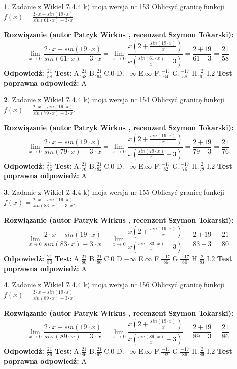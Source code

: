 \documentclass[12pt, a4paper]{article}
\theoremstyle{definition} %
\newtheorem{zad}{}
\newcommand{\zadStart}[1]{\begin{zad}#1\newline}
\newcommand{\zadStop}{\end{zad}}
\newcommand{\rozwStart}[2]{\noindent \textbf{Rozwiązanie (autor #1 , recenzent #2): }\newline}
\newcommand{\rozwStop}{\newline}
\newcommand{\odpStart}{\noindent \textbf{Odpowiedź:}\newline}
\newcommand{\odpStop}{\newline}
\newcommand{\testStart}{\noindent \textbf{Test:}\newline}
\newcommand{\testStop}{\newline}
\newcommand{\kluczStart}{\noindent \textbf{Test poprawna odpowiedź:}\newline}
\newcommand{\kluczStop}{\newline}
\begin{document}
\zadStart{Zadanie z Wikieł Z 4.4 k) moja wersja nr 153}
Obliczyć granicę funkcji $f(x)=\frac{2\cdot x +sin(19\cdot x)}{sin(61\cdot x) -3\cdot x}$.
\zadStop
\rozwStart{Patryk Wirkus}{Szymon Tokarski}
$$\lim\limits_{x\to 0}\frac{2\cdot x +sin(19\cdot x)}{sin(61\cdot x) -3\cdot x}
=\lim\limits_{x\to 0}\frac{x(2+\frac{sin(19\cdot x)}{x})}{x(\frac{sin(61\cdot x)}{x}-3)}
=\frac{2+19}{61-3} = \frac{21}{58}$$
\rozwStop
\odpStart
$\frac{21}{58}$
\odpStop
\testStart
A.$\frac{21}{58}$
B.$\frac{21}{64}$
C.$0$
D.$-\infty$
E.$\infty$
F.$\frac{-17}{64}$
G.$\frac{-17}{58}$
H.$\frac{2}{61}$
I.$2$
\testStop
\kluczStart
A
\kluczStop



\zadStart{Zadanie z Wikieł Z 4.4 k) moja wersja nr 154}
Obliczyć granicę funkcji $f(x)=\frac{2\cdot x +sin(19\cdot x)}{sin(79\cdot x) -3\cdot x}$.
\zadStop
\rozwStart{Patryk Wirkus}{Szymon Tokarski}
$$\lim\limits_{x\to 0}\frac{2\cdot x +sin(19\cdot x)}{sin(79\cdot x) -3\cdot x}
=\lim\limits_{x\to 0}\frac{x(2+\frac{sin(19\cdot x)}{x})}{x(\frac{sin(79\cdot x)}{x}-3)}
=\frac{2+19}{79-3} = \frac{21}{76}$$
\rozwStop
\odpStart
$\frac{21}{76}$
\odpStop
\testStart
A.$\frac{21}{76}$
B.$\frac{21}{82}$
C.$0$
D.$-\infty$
E.$\infty$
F.$\frac{-17}{82}$
G.$\frac{-17}{76}$
H.$\frac{2}{79}$
I.$2$
\testStop
\kluczStart
A
\kluczStop



\zadStart{Zadanie z Wikieł Z 4.4 k) moja wersja nr 155}
Obliczyć granicę funkcji $f(x)=\frac{2\cdot x +sin(19\cdot x)}{sin(83\cdot x) -3\cdot x}$.
\zadStop
\rozwStart{Patryk Wirkus}{Szymon Tokarski}
$$\lim\limits_{x\to 0}\frac{2\cdot x +sin(19\cdot x)}{sin(83\cdot x) -3\cdot x}
=\lim\limits_{x\to 0}\frac{x(2+\frac{sin(19\cdot x)}{x})}{x(\frac{sin(83\cdot x)}{x}-3)}
=\frac{2+19}{83-3} = \frac{21}{80}$$
\rozwStop
\odpStart
$\frac{21}{80}$
\odpStop
\testStart
A.$\frac{21}{80}$
B.$\frac{21}{86}$
C.$0$
D.$-\infty$
E.$\infty$
F.$\frac{-17}{86}$
G.$\frac{-17}{80}$
H.$\frac{2}{83}$
I.$2$
\testStop
\kluczStart
A
\kluczStop



\zadStart{Zadanie z Wikieł Z 4.4 k) moja wersja nr 156}
Obliczyć granicę funkcji $f(x)=\frac{2\cdot x +sin(19\cdot x)}{sin(89\cdot x) -3\cdot x}$.
\zadStop
\rozwStart{Patryk Wirkus}{Szymon Tokarski}
$$\lim\limits_{x\to 0}\frac{2\cdot x +sin(19\cdot x)}{sin(89\cdot x) -3\cdot x}
=\lim\limits_{x\to 0}\frac{x(2+\frac{sin(19\cdot x)}{x})}{x(\frac{sin(89\cdot x)}{x}-3)}
=\frac{2+19}{89-3} = \frac{21}{86}$$
\rozwStop
\odpStart
$\frac{21}{86}$
\odpStop
\testStart
A.$\frac{21}{86}$
B.$\frac{21}{92}$
C.$0$
D.$-\infty$
E.$\infty$
F.$\frac{-17}{92}$
G.$\frac{-17}{86}$
H.$\frac{2}{89}$
I.$2$
\testStop
\kluczStart
A
\kluczStop
\end{document}
